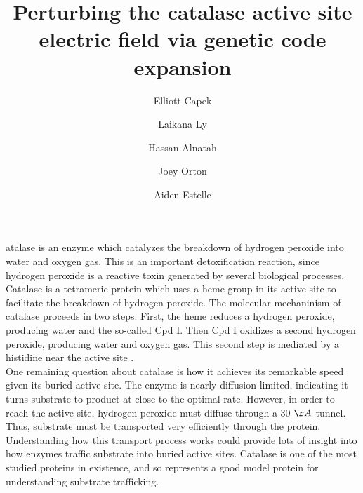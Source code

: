 \documentclass[9pt,twocolumn,twoside]{pnas-new}
\title{Perturbing the catalase active site electric field via genetic code expansion}
\author[a,1,2]{Elliott Capek}
\author[a]{Laikana Ly}
\author[a]{Hassan Alnatah}
\author[a]{Joey Orton}
\author[a]{Aiden Estelle}
\affil[a]{Oregon State University Department of Biohchemistry and Biophysics}
\begin{document}
\verticaladjustment{-2pt}

\maketitle
\thispagestyle{firststyle}

atalase is an enzyme which catalyzes the breakdown of hydrogen peroxide into water and oxygen gas. This is an important detoxification reaction, since hydrogen peroxide is a reactive toxin generated by several biological processes. Catalase is a tetrameric protein which uses a heme group in its active site to facilitate the breakdown of hydrogen peroxide. The molecular mechaninism of catalase proceeds in two steps. First, the heme reduces a hydrogen peroxide, producing water and the so-called Cpd I. Then Cpd I oxidizes a second hydrogen peroxide, producing water and oxygen gas. This second step is mediated by a histidine near the active site \cite{alfonso-prieto}.\\

One remaining question about catalase is how it achieves its remarkable speed given its buried active site. The enzyme is nearly diffusion-limited\cite{kcatkm, difflimit}, indicating it turns substrate to product at close to the optimal rate. However, in order to reach the active site, hydrogen peroxide must diffuse through a 30 $\AA$ tunnel\cite{substrateflow}. Thus, substrate must be transported very efficiently through the protein. Understanding how this transport process works could provide lots of insight into how enzymes traffic substrate into buried active sites. Catalase is one of the most studied proteins in existence, and so represents a good model protein for understanding substrate trafficking.\\
\end{document}
